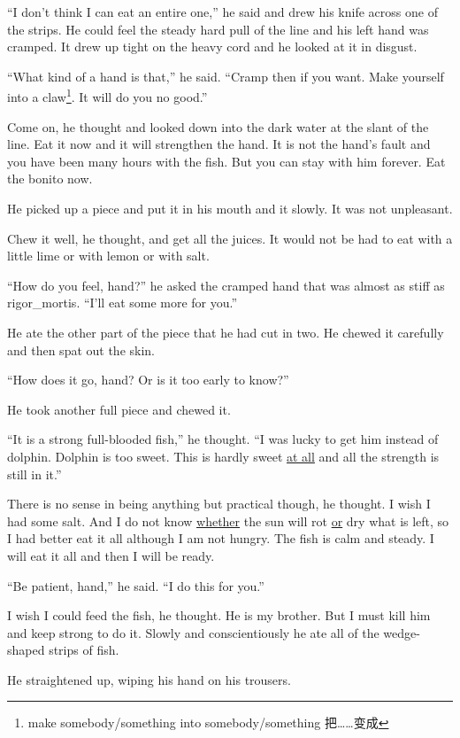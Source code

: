 ``I don't think I can eat an \gls{entire} one,'' he said and drew his knife
across one of the strips. He could feel the steady hard pull of the line and
his left hand was cramped. It drew up tight on the heavy cord and he
looked at it in \gls{disgust}.

``What kind of a hand is that,'' he said. ``Cramp then if you want. Make
yourself into a \gls{claw}\footnote{make somebody/something into
  somebody/something 把……变成}. It will do you no good.''

Come on, he thought and looked down into the dark water at the slant of the
line. Eat it now and it will \gls{strengthen} the hand. It is not the hand's
fault and you have been many hours with the fish. But you can stay with him
forever. Eat the bonito now.

He picked up a piece and put it in his mouth and  it slowly. It
was not unpleasant.

Chew it well, he thought, and get all the juices. It would not be had to eat
with a little \gls{lime} or with lemon or with salt.

``How do you feel, hand?'' he asked the cramped hand that was almost as
stiff as \gls{rigor_mortis}. ``I'll eat some more for you.''

He ate the other part of the piece that he had cut in two. He chewed it
carefully and then spat out the skin.

``How does it go, hand? Or is it too early to know?''

He took another full piece and chewed it.

``It is a strong \gls{full-blooded} fish,'' he thought. ``I was lucky to get him
\gls{instead} of dolphin. Dolphin is too sweet. This is hardly sweet \uline{at all} and
all the strength is still in it.''

There is no sense in being anything but \gls{practical} though, he thought. I wish
I had some salt. And I do not know \uline{whether} the sun will \gls{rot} \uline{or} dry
what is left, so I had better eat it all although I am not hungry. The fish
is calm and steady. I will eat it all and then I will be ready.

``Be patient, hand,'' he said. ``I do this for you.''

I wish I could feed the fish, he thought. He is my brother. But I must kill
him and keep strong to do it. Slowly and \gls{conscientiously} he ate all of
the wedge-shaped strips of fish.

He straightened up, wiping his hand on his trousers.

